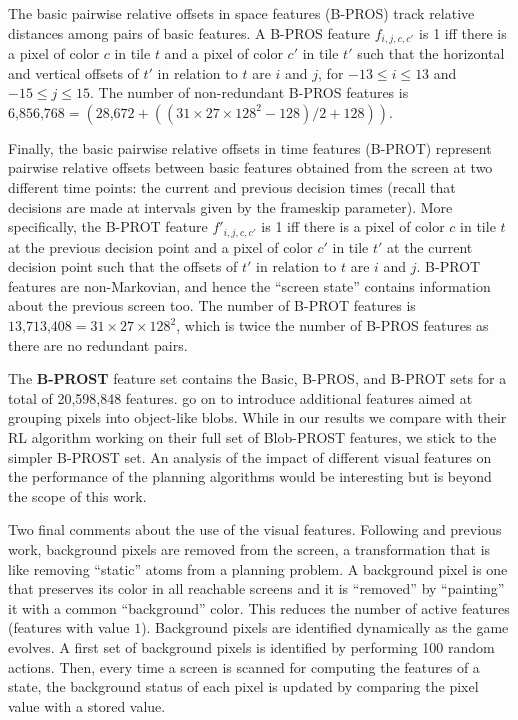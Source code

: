 \documentclass[letterpaper]{article}
\begin{document}
The basic pairwise relative offsets in space  features (B-PROS)
track relative distances among pairs of basic features.
A  B-PROS feature $f_{i,j,c,c'}$ is 1  iff there is a  pixel of color $c$ in tile $t$ and a pixel of color $c'$ in tile
$t'$ such that the horizontal and vertical offsets of  $t'$ in relation to $t$
are $i$ and $j$, for $-13 \leq i \leq 13$ and $-15 \leq j \leq 15$.
The number of non-redundant B-PROS features is
$\text{6,856,768} = (\text{28,672} + ((31 \times 27 \times 128^2 - 128)/2 + 128))$.

Finally, the basic pairwise relative  offsets in time    features (B-PROT)
represent pairwise relative offsets between basic  features obtained from the screen
at two  different time points: the current and previous decision times (recall that decisions are made at  intervals given by the frameskip parameter).
More specifically,  the B-PROT feature $f'_{i,j,c,c'}$ is 1 iff  there is a  pixel of color $c$ in  tile $t$
at the previous decision point and  a pixel of color $c'$ in tile $t'$ at the current decision point
such that the offsets of $t'$ in relation to $t$  are $i$ and $j$. B-PROT features are non-Markovian,
and hence the ``screen state'' contains information about the previous screen too.
The number of B-PROT features is $\text{13,713,408} = 31\times27\times128^2$, which is twice the number of B-PROS features as there are no redundant pairs.

The \textbf{B-PROST} feature set contains the Basic, B-PROS, and B-PROT sets for a total of
20,598,848 features. \citeauthor{shallow} go on to introduce additional features aimed at grouping pixels
into object-like blobs. While in our results we compare with their RL algorithm working on their
full set of  Blob-PROST features, we stick to the  simpler B-PROST set.
An  analysis of the impact of different visual features  on the performance of the
planning algorithms would be interesting but is beyond the scope of this work.

Two final comments about the use of the visual features. Following
\citeauthor{shallow} and previous work,  background pixels
are removed from the screen, a transformation that is like
removing ``static'' atoms from a planning problem.
A background pixel is one that preserves its color in all
reachable screens and it is ``removed'' by ``painting''
it with a common ``background''  color. This reduces the number
of active features (features with value $1$).
Background pixels are identified dynamically as the game
evolves. A first set of background pixels is identified by
performing 100 random actions. Then, every time a screen is
scanned for computing the features of a state, the background
status of each pixel is updated by comparing the pixel value
with a stored value.
\end{document}

